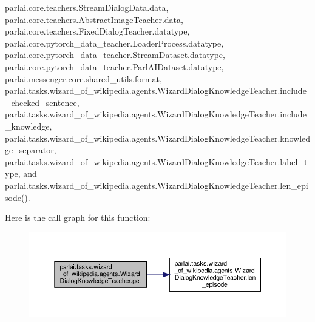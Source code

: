parlai.\+core.\+teachers.\+Stream\+Dialog\+Data.\+data, parlai.\+core.\+teachers.\+Abstract\+Image\+Teacher.\+data, parlai.\+core.\+teachers.\+Fixed\+Dialog\+Teacher.\+datatype, parlai.\+core.\+pytorch\+\_\+data\+\_\+teacher.\+Loader\+Process.\+datatype, parlai.\+core.\+pytorch\+\_\+data\+\_\+teacher.\+Stream\+Dataset.\+datatype, parlai.\+core.\+pytorch\+\_\+data\+\_\+teacher.\+Parl\+A\+I\+Dataset.\+datatype, parlai.\+messenger.\+core.\+shared\+\_\+utils.\+format, parlai.\+tasks.\+wizard\+\_\+of\+\_\+wikipedia.\+agents.\+Wizard\+Dialog\+Knowledge\+Teacher.\+include\+\_\+checked\+\_\+sentence, parlai.\+tasks.\+wizard\+\_\+of\+\_\+wikipedia.\+agents.\+Wizard\+Dialog\+Knowledge\+Teacher.\+include\+\_\+knowledge, parlai.\+tasks.\+wizard\+\_\+of\+\_\+wikipedia.\+agents.\+Wizard\+Dialog\+Knowledge\+Teacher.\+knowledge\+\_\+separator, parlai.\+tasks.\+wizard\+\_\+of\+\_\+wikipedia.\+agents.\+Wizard\+Dialog\+Knowledge\+Teacher.\+label\+\_\+type, and parlai.\+tasks.\+wizard\+\_\+of\+\_\+wikipedia.\+agents.\+Wizard\+Dialog\+Knowledge\+Teacher.\+len\+\_\+episode().

Here is the call graph for this function\+:
\nopagebreak
\begin{figure}[H]
\begin{center}
\leavevmode
\includegraphics[width=350pt]{classparlai_1_1tasks_1_1wizard__of__wikipedia_1_1agents_1_1WizardDialogKnowledgeTeacher_afb8212ad3cf99ccf6507eacef747f9d4_cgraph}
\end{center}
\end{figure}
\mbox{\label{classparlai_1_1tasks_1_1wizard__of__wikipedia_1_1agents_1_1WizardDialogKnowledgeTeacher_adc1c3fa619c8bffd25986d41fb6f4136}} 
